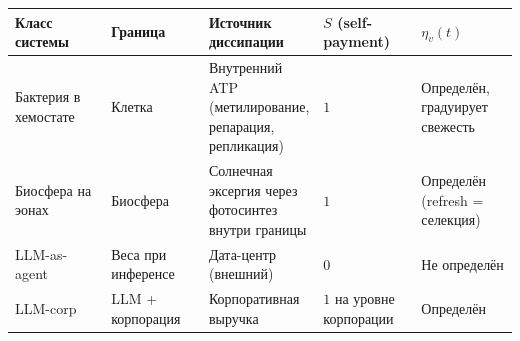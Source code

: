 \documentclass[pdflatex,sn-mathphys-ay]{sn-jnl}
\begin{document}
\begin{center}\small
\begin{tabular}{@{} >{\raggedright\arraybackslash}p{0.2000\linewidth} >{\raggedright\arraybackslash}p{0.2000\linewidth} >{\raggedright\arraybackslash}p{0.2000\linewidth} >{\raggedright\arraybackslash}p{0.2000\linewidth} >{\raggedright\arraybackslash}p{0.2000\linewidth}@{}}
\toprule

\begin{minipage}[b]{\linewidth}\raggedright

Класс системы

\end{minipage} & \begin{minipage}[b]{\linewidth}\raggedright

Граница

\end{minipage} & \begin{minipage}[b]{\linewidth}\raggedright

Источник диссипации

\end{minipage} & \begin{minipage}[b]{\linewidth}\raggedright

\(S\) (self-payment)

\end{minipage} & \begin{minipage}[b]{\linewidth}\raggedright

\(\eta_v(t)\)

\end{minipage} \\

\midrule

Бактерия в хемостате & Клетка & Внутренний ATP (метилирование, репарация, репликация) & \(1\) & Определён, градуирует свежесть \\

Биосфера на эонах & Биосфера & Солнечная эксергия через фотосинтез внутри границы & \(1\) & Определён (refresh = селекция) \\

LLM-as-agent & Веса при инференсе & Дата-центр (внешний) & \(0\) & Не определён \\

LLM-corp & LLM + корпорация & Корпоративная выручка & \(1\) на уровне корпорации & Определён \\

\bottomrule
\end{tabular}
\end{center}
\end{document}
